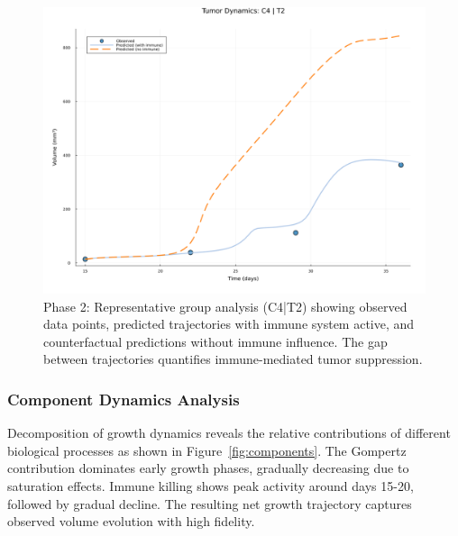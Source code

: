 \documentclass{juliacon}
\begin{document}
\begin{figure}[H]\centering
\includegraphics[width=\linewidth]{group_C4_T2_volume_comparison.png}
\caption{Phase 2: Representative group analysis (C4|T2) showing observed data points, predicted trajectories with immune system active, and counterfactual predictions without immune influence. The gap between trajectories quantifies immune-mediated tumor suppression.}
\label{fig:group_vol_comparison}
\end{figure}

\subsubsection{Component Dynamics Analysis}

Decomposition of growth dynamics reveals the relative contributions of different biological processes as shown in Figure~\ref{fig:components}. The Gompertz contribution dominates early growth phases, gradually decreasing due to saturation effects. Immune killing shows peak activity around days 15-20, followed by gradual decline. The resulting net growth trajectory captures observed volume evolution with high fidelity.
\end{document}
